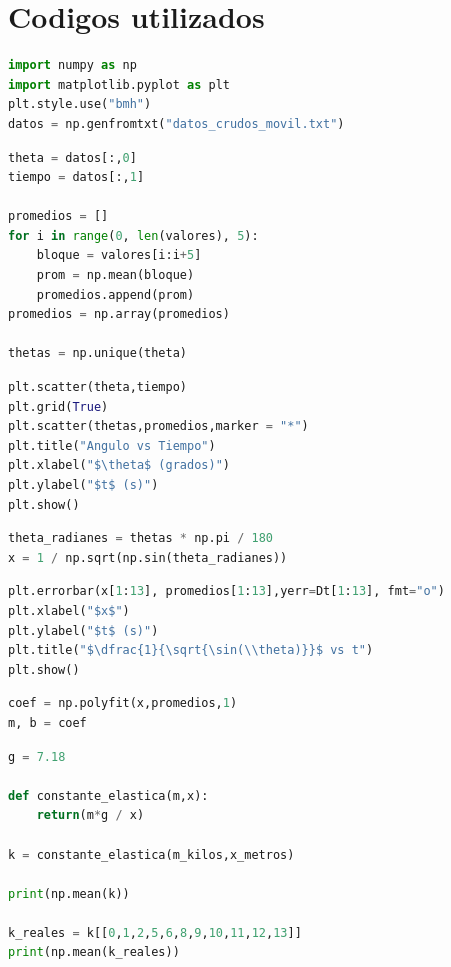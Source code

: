 \documentclass{article}
\begin{document}
\section*{Codigos utilizados}

\begin{lstlisting}[language=Python, caption= Código para importar librerias 
   y datos]
import numpy as np
import matplotlib.pyplot as plt
plt.style.use("bmh")
datos = np.genfromtxt("datos_crudos_movil.txt")
\end{lstlisting}


\begin{lstlisting}[language=Python, caption= Código para calcular promedios de tiempos]
theta = datos[:,0]
tiempo = datos[:,1]

promedios = []
for i in range(0, len(valores), 5):
    bloque = valores[i:i+5]
    prom = np.mean(bloque)
    promedios.append(prom)
promedios = np.array(promedios)

thetas = np.unique(theta) 

\end{lstlisting}

\begin{lstlisting}[language=Python, caption= Código para graficar datos y 
   promedios]
plt.scatter(theta,tiempo)
plt.grid(True)
plt.scatter(thetas,promedios,marker = "*")
plt.title("Angulo vs Tiempo")
plt.xlabel("$\theta$ (grados)")
plt.ylabel("$t$ (s)")
plt.show()
\end{lstlisting}

\begin{lstlisting}[language=Python, caption= Código para pasar 
   ángulos a radianes y linealizar modelo]
theta_radianes = thetas * np.pi / 180
x = 1 / np.sqrt(np.sin(theta_radianes))
\end{lstlisting}

\begin{lstlisting}[language=Python, caption= Código para graficar 
   modelo linealizado]
plt.errorbar(x[1:13], promedios[1:13],yerr=Dt[1:13], fmt="o")
plt.xlabel("$x$")
plt.ylabel("$t$ (s)")
plt.title("$\dfrac{1}{\sqrt{\sin(\\theta)}}$ vs t")
plt.show()
\end{lstlisting}

\begin{lstlisting}[language=Python, caption= Código para el ajuste lineal]
coef = np.polyfit(x,promedios,1)
m, b = coef
\end{lstlisting}

\begin{lstlisting}[language=Python, caption= Código para calcular $k$]
g = 7.18

def constante_elastica(m,x):
    return(m*g / x)

k = constante_elastica(m_kilos,x_metros)

print(np.mean(k))

k_reales = k[[0,1,2,5,6,8,9,10,11,12,13]]
print(np.mean(k_reales))
\end{lstlisting}
\end{document}
